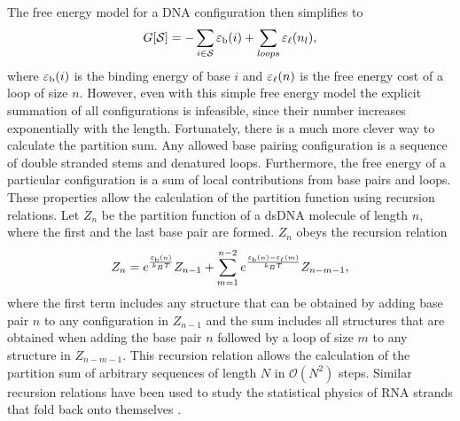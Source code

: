 The free energy model for a DNA configuration then simplifies to%
\begin{equation}
\label{eq:dna_melting_energy}
G[{\cal S}]=-\sum_{i\in {\cal S}} {\varepsilon_{\rm b}}(i) + \sum_{loops} {\varepsilon_{\ell}}(n_l),
\end{equation}
where ${\varepsilon_{\rm b}}(i)$ is the binding energy of base $i$ and ${\varepsilon_{\ell}}(n)$ is the free energy cost of a loop of size $n$.
However, even with this simple free energy model the explicit summation of all configurations 
is infeasible, since their number increases exponentially with the length.
Fortunately, there is a much more clever way to calculate the partition sum. Any allowed 
base pairing configuration is a sequence of double stranded stems and denatured
loops. Furthermore, the free energy of a particular configuration is a sum of local contributions 
from base pairs and loops. These properties allow the calculation of the partition function using recursion relations.
Let $Z_n$ be the partition function of a dsDNA molecule of length $n$, 
where the first and the last base pair are formed. $Z_n$ obeys the recursion relation
\begin{equation}
\label{eq:PS-recurrence}
Z_n=e^{\frac{{\varepsilon_{\rm b}}(n)}{k_BT}} Z_{n-1}+\sum_{m=1}^{n-2}e^{\frac{{\varepsilon_{\rm b}}(n)-{\varepsilon_{\ell}}(m)}{k_BT}} Z_{n-m-1},
\end{equation}
where the first term includes any structure that can be obtained by adding base pair $n$ to any configuration
in $Z_{n-1}$ and the sum includes all structures that are obtained when adding the base pair $n$
followed by a loop of size $m$ to any structure in $Z_{n-m-1}$.
This recursion relation allows the calculation of the partition sum of arbitrary sequences of length $N$
in $\mathcal{O}(N^{2})$ steps. Similar recursion relations have been used to study the statistical physics
of RNA strands that fold back onto themselves \cite{Bundschuh_PRL_99, Flamm_RNA_00}.

